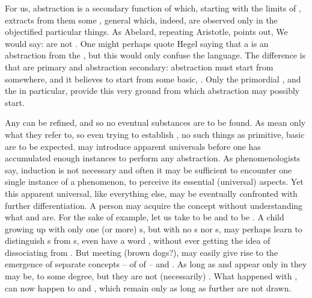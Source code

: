 
For us, abstraction is a secondary function of  which, starting
with the  limits of , extracts from them some
, general  which, indeed, are observed only in the
{objectified} particular things. As Abelard, repeating Aristotle, points out,
 We would
say:  are not . One might perhaps quote Hegel
saying that a 
 is an abstraction from the , but this would only
confuse the language. The difference is that  are primary and
abstraction secondary: abstraction must start from somewhere, and it believes to
start from some basic, .  Only the primordial
, and the  in particular, provide
this very ground from which abstraction may possibly 
start. 

Any  can be refined, and so no eventual substances are to be
found. As  mean only what
they refer to, so even trying to establish ,  no such
things as primitive, basic  are to be expected.
 may introduce apparent universals before one has accumulated
enough  instances to perform any abstraction. As
phenomenologists say, induction is not necessary and often it may be sufficient
to encounter one single instance of a phenomenon, to perceive its essential
(universal) aspects. Yet this apparent universal, like everything else, may be
eventually confronted with further differentiation. A person may acquire the
concept  without 
understanding what  and  are. For the sake of example, 
let us take  to be 
and  to be .  A child growing up with only one (or more)
s, but with no s nor s, may perhaps learn to distinguish
s from s, even have a word , without ever getting the
idea of dissociating  from . But meeting  (brown dogs?),
may easily give rise to the emergence of separate concepts -- of
 of --  and .
As long as  and  appear only in  they may be, to some
degree,  but they are not (necessarily) . 
What happened with , can now happen to  and , which remain
 only as long as further  are not drawn. 

